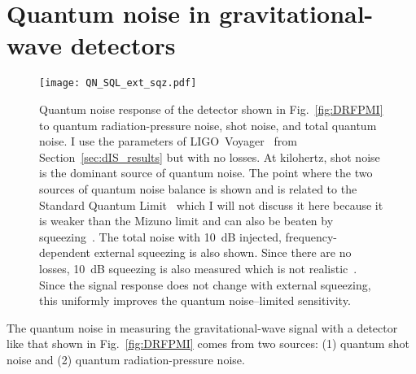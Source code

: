 

\section{Quantum noise in gravitational-wave detectors}
\label{sec:qnoise_GW_IFO}


\begin{figure}
	\centering
	\texttt{[image: QN\_SQL\_ext\_sqz.pdf]}
	\caption{ Quantum noise response of the detector shown in Fig.~\ref{fig:DRFPMI} to quantum radiation-pressure noise, shot noise, and total quantum noise. I use the parameters of LIGO~Voyager~\cite{} from Section~\ref{sec:dIS_results} but with no losses. At kilohertz, shot noise is the dominant source of quantum noise. The point where the two sources of quantum noise balance is shown and is related to the Standard Quantum Limit~\cite{} which I will not discuss it here because it is weaker than the Mizuno limit and can also be beaten by squeezing~\cite{}.
	The total noise with 10~dB injected, frequency-dependent external squeezing is also shown. Since there are no losses, 10~dB squeezing is also measured which is not realistic~\cite{}. Since the signal response does not change with external squeezing, this uniformly improves the quantum noise--limited sensitivity.	
	} %
	\label{fig:simplifed_QN_response_conventional}
\end{figure}

The quantum noise in measuring the gravitational-wave signal with a detector like that shown in Fig.~\ref{fig:DRFPMI} comes from two sources: (1) quantum shot noise and (2) quantum radiation-pressure noise.

